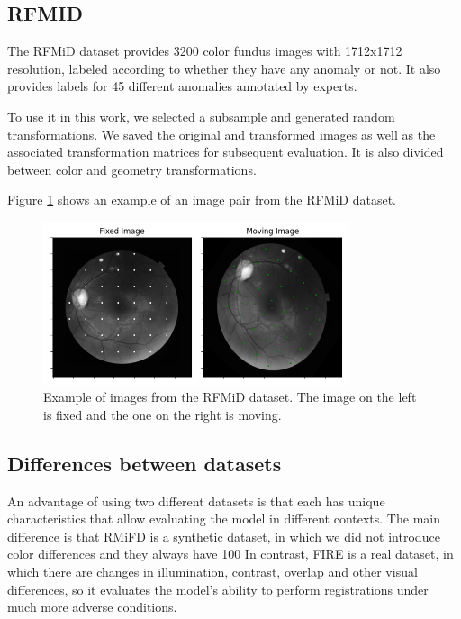 \subsection{RFMID}\label{subsec:RFMID}

The RFMiD dataset \cite{RFMiD} provides 3200 color fundus images with 1712x1712 resolution, labeled according to whether they have any anomaly or not.
It also provides labels for 45 different anomalies annotated by experts.

To use it in this work, we selected a subsample and generated random transformations. We saved the original and transformed images as well as the associated transformation matrices for subsequent evaluation.
It is also divided between color and geometry transformations.

Figure \ref{fig:rfmid_ej} shows an example of an image pair from the RFMiD dataset.

\begin{figure}[tbp]
    \centering
    \includegraphics[width=0.8\textwidth]{imaxes/rfmid_ej.png}
    \caption{Example of images from the RFMiD dataset. The image on the left is fixed and the one on the right is moving.}
    \label{fig:rfmid_ej} 
\end{figure} 

\subsection{Differences between datasets}
\label{subsec:Diferencias entre os datasets}

An advantage of using two different datasets is that each has unique characteristics that allow evaluating the model in different contexts.
The main difference is that RMiFD is a synthetic dataset, in which we did not introduce color differences and they always have 100%
In contrast, FIRE is a real dataset, in which there are changes in illumination, contrast, overlap and other visual differences, so it evaluates the model's ability to perform registrations under much more adverse conditions.

